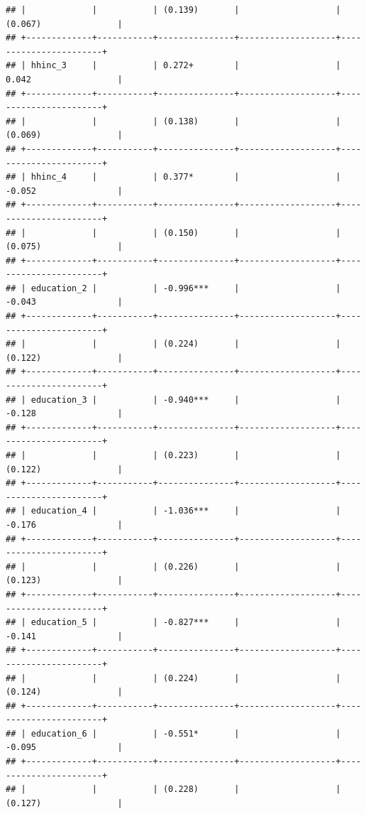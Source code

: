 \documentclass[
]{article}
\begin{document}
\begin{verbatim}
## |             |           | (0.139)       |                   | (0.067)               |
## +-------------+-----------+---------------+-------------------+-----------------------+
## | hhinc_3     |           | 0.272+        |                   | 0.042                 |
## +-------------+-----------+---------------+-------------------+-----------------------+
## |             |           | (0.138)       |                   | (0.069)               |
## +-------------+-----------+---------------+-------------------+-----------------------+
## | hhinc_4     |           | 0.377*        |                   | -0.052                |
## +-------------+-----------+---------------+-------------------+-----------------------+
## |             |           | (0.150)       |                   | (0.075)               |
## +-------------+-----------+---------------+-------------------+-----------------------+
## | education_2 |           | -0.996***     |                   | -0.043                |
## +-------------+-----------+---------------+-------------------+-----------------------+
## |             |           | (0.224)       |                   | (0.122)               |
## +-------------+-----------+---------------+-------------------+-----------------------+
## | education_3 |           | -0.940***     |                   | -0.128                |
## +-------------+-----------+---------------+-------------------+-----------------------+
## |             |           | (0.223)       |                   | (0.122)               |
## +-------------+-----------+---------------+-------------------+-----------------------+
## | education_4 |           | -1.036***     |                   | -0.176                |
## +-------------+-----------+---------------+-------------------+-----------------------+
## |             |           | (0.226)       |                   | (0.123)               |
## +-------------+-----------+---------------+-------------------+-----------------------+
## | education_5 |           | -0.827***     |                   | -0.141                |
## +-------------+-----------+---------------+-------------------+-----------------------+
## |             |           | (0.224)       |                   | (0.124)               |
## +-------------+-----------+---------------+-------------------+-----------------------+
## | education_6 |           | -0.551*       |                   | -0.095                |
## +-------------+-----------+---------------+-------------------+-----------------------+
## |             |           | (0.228)       |                   | (0.127)               |

\end{verbatim}
\end{document}

